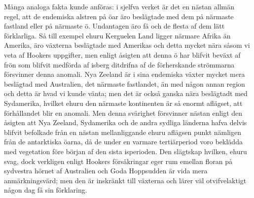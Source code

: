 Många analoga fakta kunde anföras: i sjelfva verket är det en nästan allmän regel, att de endemiska alstren på öar äro beslägtade med dem på närmaste fastland eller på närmaste ö. Undantagen äro få och de flesta af dem lätt förklarliga. Så till exempel ehuru Kerguelen Land ligger närmare Afrika än Amerika, äro växterna beslägtade med Amerikas och detta mycket nära såsom vi veta af Hookers uppgifter, men enligt åsigten att denna ö har blifvit beväxt af frön som blifvit medförda af isberg ditdrifna af de förherskande strömmarna försvinner denna anomali. Nya Zeeland är i sina endemiska växter mycket mera beslägtad med Australien, det närmaste fastlandet, än med någon annan region och detta är hvad vi kunde vänta; men det är också ganska nära beslägtadt med Sydamerika, hvilket ehuru den närmaste kontinenten är så enormt aflägset, att förhållandet blir en anomali. Men denna svårighet försvinner nästan enligt den åsigten att Nya Zeeland, Sydamerika och de andra sydliga länderna hafva delvis blifvit befolkade från en nästan mellanliggande ehuru aflägsen punkt nämligen från de antarktiska öarna, då de under en varmare tertiärperiod voro beklädda med vegetation före början af den sista isperioden. Den slägtskap hvilken, ehuru svag, dock verkligen enligt Hookers försäkringar eger rum emellan floran på sydvestra hörnet af Australien och Goda Hoppsudden är vida mera anmärkningsvärd; men den är inskränkt till växterna och lärer väl otvifvelaktigt någon dag få sin förklaring.

